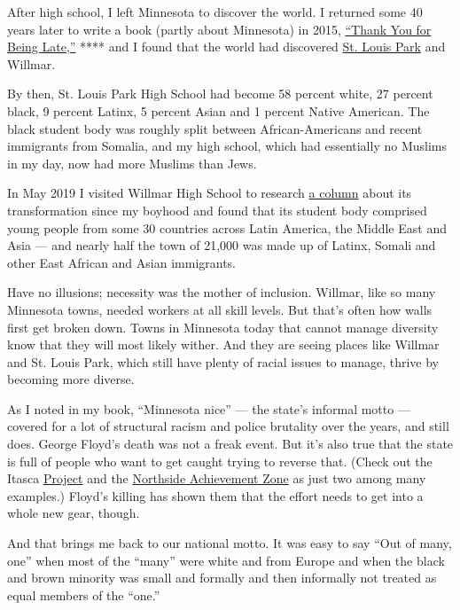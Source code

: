 After high school, I left Minnesota to discover the world. I returned
some 40 years later to write a book (partly about Minnesota) in 2015,
\href{https://www.thomaslfriedman.com/thank-you-for-being-late/}{``Thank
You for Being Late,''} **** and I found that the world had discovered
\href{https://discoverstlouispark.com/about-st-louis-park/}{St. Louis
Park} and Willmar.

By then, St. Louis Park High School had become 58 percent white, 27
percent black, 9 percent Latinx, 5 percent Asian and 1 percent Native
American. The black student body was roughly split between
African-Americans and recent immigrants from Somalia, and my high
school, which had essentially no Muslims in my day, now had more Muslims
than Jews.

In May 2019 I visited Willmar High School to research
\href{https://www.nytimes.com/2019/05/14/opinion/trump-willmar-minnesota.html}{a
column} about its transformation since my boyhood and found that its
student body comprised young people from some 30 countries across Latin
America, the Middle East and Asia --- and nearly half the town of 21,000
was made up of Latinx, Somali and other East African and Asian
immigrants.

Have no illusions; necessity was the mother of inclusion. Willmar, like
so many Minnesota towns, needed workers at all skill levels. But that's
often how walls first get broken down. Towns in Minnesota today that
cannot manage diversity know that they will most likely wither. And they
are seeing places like Willmar and St. Louis Park, which still have
plenty of racial issues to manage, thrive by becoming more diverse.

As I noted in my book, ``Minnesota nice'' --- the state's informal motto
--- covered for a lot of structural racism and police brutality over the
years, and still does. George Floyd's death was not a freak event. But
it's also true that the state is full of people who want to get caught
trying to reverse that. (Check out the Itasca
\href{https://www.theitascaproject.com/}{Project} and the
\href{https://northsideachievement.org/}{Northside Achievement Zone} as
just two among many examples.) Floyd's killing has shown them that the
effort needs to get into a whole new gear, though.

And that brings me back to our national motto. It was easy to say ``Out
of many, one'' when most of the ``many'' were white and from Europe and
when the black and brown minority was small and formally and then
informally not treated as equal members of the ``one.''

